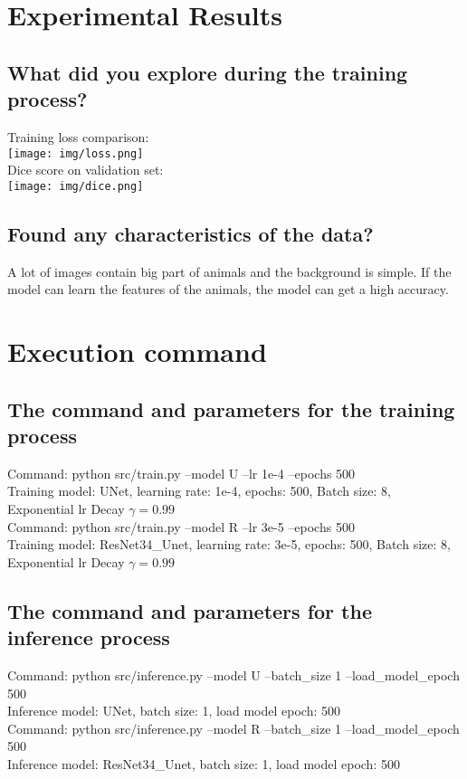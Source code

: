 \documentclass{article} %
\begin{document}
    \section{Experimental Results}
    \subsection{What did you explore during the training process?}
    Training loss comparison: \\
    \texttt{[image: img/loss.png]} \\
    Dice score on validation set: \\
    \texttt{[image: img/dice.png]} \\
    \subsection{Found any characteristics of the data?}
    A lot of images contain big part of animals and the background is simple. 
    If the model can learn the features of the animals, the model can get a high accuracy. \\

    \section{Execution command}
    \subsection{The command and parameters for the training process}
    Command: python src/train.py --model U --lr 1e-4 --epochs 500 \\
    Training model: UNet, learning rate: 1e-4, epochs: 500, Batch size: 8,\\ Exponential lr Decay $\gamma=0.99$ \\
    Command: python src/train.py --model R --lr 3e-5 --epochs 500 \\
    Training model: ResNet34\_Unet, learning rate: 3e-5, epochs: 500, Batch size: 8,\\ Exponential lr Decay $\gamma=0.99$ \\
    \subsection{The command and parameters for the inference process}
    Command: python src/inference.py --model U --batch\_size 1 --load\_model\_epoch 500 \\
    Inference model: UNet, batch size: 1, load model epoch: 500 \\
    Command: python src/inference.py --model R --batch\_size 1 --load\_model\_epoch 500 \\
    Inference model: ResNet34\_Unet, batch size: 1, load model epoch: 500 \\
\end{document}
